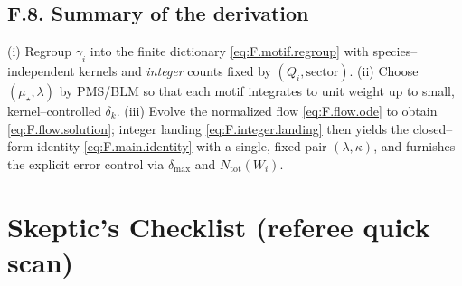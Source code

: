 \documentclass[epjc3]{svjour3}
\begin{document}
\subsection*{F.8. Summary of the derivation}
(i) Regroup $\gamma_i$ into the finite dictionary \eqref{eq:F.motif.regroup} with species--independent kernels and \emph{integer} counts fixed by $(Q_i,\text{sector})$. (ii) Choose $(\mu_\star,\lambda)$ by PMS/BLM so that each motif integrates to unit weight up to small, kernel--controlled $\delta_k$. (iii) Evolve the normalized flow \eqref{eq:F.flow.ode} to obtain \eqref{eq:F.flow.solution}; integer landing \eqref{eq:F.integer.landing} then yields the closed--form identity \eqref{eq:F.main.identity} with a single, fixed pair $(\lambda,\kappa)$, and furnishes the explicit error control via $\delta_{\max}$ and $N_{\mathrm{tot}}(W_i)$.

\clearpage
\section{Skeptic's Checklist (referee quick scan)}
\end{document}
